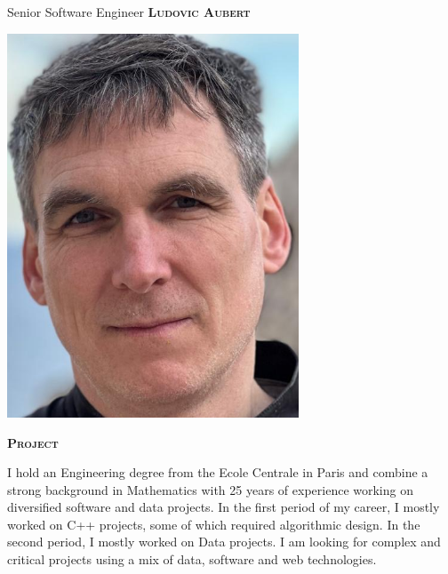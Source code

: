 \documentclass[11pt, a4paper]{article}
\newcommand{\headleft}[1]{\vspace*{3ex}\textsc{\textbf{#1}}\par%
    \vspace*{-1.5ex}\hrulefill\par\vspace*{0.7ex}}
\begin{document}
\setlength{\topskip}{0pt}
\setlength{\parindent}{0pt}
\setlength{\parskip}{0pt}
\setlength{\fboxsep}{0pt}
\pagestyle{empty}
\raggedbottom

\begin{minipage}[t]{0.33\textwidth} %
\colorbox{cvblue}{\begin{minipage}[t][5mm][t]{\textwidth}\null\hfill\null\end{minipage}}

\vspace{-.2ex} %
\colorbox{cvblue!90}{\color{white}  %
\textwidth\relax%
\begin{minipage}[t][293mm][t]{0.82\textwidth}
\raggedright
\vspace*{2.5ex}

\Large Senior Software Engineer \textbf{\textsc{Ludovic Aubert}} \normalsize 

\null\hfill\includegraphics[width=0.65\textwidth]{lax.png}\hfill\null

\vspace*{0.5ex} %

\headleft{Project}
I hold an Engineering degree from the Ecole Centrale in Paris and combine a strong background in Mathematics with 25 years of experience working on diversified software and data projects. In the first period of my career, I mostly worked on C++ projects, some of which required algorithmic design. In the second period, I mostly worked on Data projects. I am looking for complex and critical projects using a mix of data, software and web technologies.


\end{minipage}}
\end{minipage}
\end{document}
